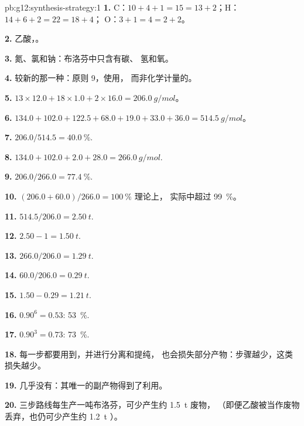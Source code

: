 \begin{solution}{pb:g12:synthesis-strategy:1}
\textbf{1.} C：$10 + 4 + 1 = 15 = 13 + 2$；H：$14 + 6 + 2 = 22 = 18 + 4$；
O：$3 + 1 = 4 = 2 + 2$。

\textbf{2.} 乙酸，。

\textbf{3.} 氮、氯和钠：布洛芬中只含有碳、
氢和氧。

\textbf{4.} 较新的那一种：原则 9，使用，
而非化学计量的。

\textbf{5.} $13 \times 12.0 + 18 \times 1.0 + 2 \times 16.0 =
\qty{206.0}{g/mol}$。

\textbf{6.} $134.0 + 102.0 + 122.5 + 68.0 + 19.0 + 33.0 + 36.0 =
\qty{514.5}{g/mol}$。

\textbf{7.} $206.0/514.5 = \qty{40.0}{\percent}$.

\textbf{8.} $134.0 + 102.0 + 2.0 + 28.0 = \qty{266.0}{g/mol}$.

\textbf{9.} $206.0/266.0 = \qty{77.4}{\percent}$.

\textbf{10.} $(206.0 + 60.0)/266.0 = \qty{100}{\percent}$ 理论上，
实际中超过 \qty{99}{\percent}。

\textbf{11.} $514.5/206.0 = \qty{2.50}{t}$.

\textbf{12.} $2.50 - 1 = \qty{1.50}{t}$.

\textbf{13.} $266.0/206.0 = \qty{1.29}{t}$.

\textbf{14.} $60.0/206.0 = \qty{0.29}{t}$.

\textbf{15.} $1.50 - 0.29 = \qty{1.21}{t}$.

\textbf{16.} $0.90^6 = 0.53$: \qty{53}{\percent}.

\textbf{17.} $0.90^3 = 0.73$: \qty{73}{\percent}.

\textbf{18.} 每一步都要用到，并进行分离和提纯，
也会损失部分产物：步骤越少，这类损失越少。

\textbf{19.} 几乎没有：其唯一的副产物得到了利用。

\textbf{20.} 三步路线每生产一吨布洛芬，可少产生约 \qty{1.5}{t} 废物，
（即便乙酸被当作废物丢弃，也仍可少产生约 \qty{1.2}{t}
）。
\end{solution}
